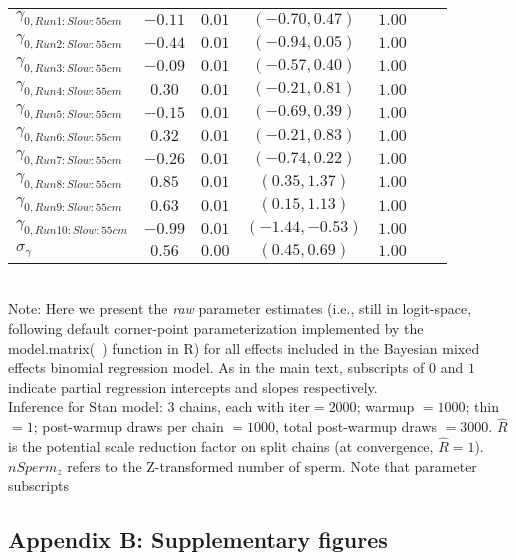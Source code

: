 \documentclass{article}
\begin{document}
\begin{table}[!ht]
\begin{tabular}{l c c c c c c}
$\gamma_{0,Run1:Slow:55cm}$   & $-0.11$ & $0.01$ & $(-0.70, 0.47)$ & $1.00$ \\
$\gamma_{0,Run2:Slow:55cm}$   & $-0.44$ & $0.01$ & $(-0.94, 0.05)$ & $1.00$ \\
$\gamma_{0,Run3:Slow:55cm}$   & $-0.09$ & $0.01$ & $(-0.57, 0.40)$ & $1.00$ \\
$\gamma_{0,Run4:Slow:55cm}$   & $ 0.30$ & $0.01$ & $(-0.21, 0.81)$ & $1.00$ \\
$\gamma_{0,Run5:Slow:55cm}$   & $-0.15$ & $0.01$ & $(-0.69, 0.39)$ & $1.00$ \\
$\gamma_{0,Run6:Slow:55cm}$   & $ 0.32$ & $0.01$ & $(-0.21, 0.83)$ & $1.00$ \\
$\gamma_{0,Run7:Slow:55cm}$   & $-0.26$ & $0.01$ & $(-0.74, 0.22)$ & $1.00$ \\
$\gamma_{0,Run8:Slow:55cm}$   & $ 0.85$ & $0.01$ & $( 0.35, 1.37)$ & $1.00$ \\
$\gamma_{0,Run9:Slow:55cm}$   & $ 0.63$ & $0.01$ & $( 0.15, 1.13)$ & $1.00$ \\
$\gamma_{0,Run10:Slow:55cm}$  & $-0.99$ & $0.01$ & $(-1.44,-0.53)$ & $1.00$ \\
$\sigma_{\gamma}$             & $ 0.56$ & $0.00$ & $( 0.45, 0.69)$ & $1.00$ \\
\hline
\end{tabular}
\smallskip{} \\
{\footnotesize Note: Here we present the \textit{raw} parameter estimates (i.e., still in logit-space, following default corner-point parameterization implemented by the model.matrix(~) function in R) for all effects included in the Bayesian mixed effects binomial regression model. As in the main text, subscripts of $0$ and $1$ indicate partial regression intercepts and slopes respectively.\\Inference for Stan model: $3$ chains, each with iter$=2000$; warmup $ = 1000$; thin $= 1$; post-warmup draws per chain $= 1000$, total post-warmup draws $= 3000$. $\hat{R}$ is the potential scale reduction factor on split chains (at convergence, $\hat{R} = 1$). $nSperm_z$ refers to the Z-transformed number of sperm. Note that parameter subscripts }
\end{table}
\bigskip








\newpage{}

\subsection*{Appendix B: Supplementary figures}
\renewcommand{\theequation}{S\arabic{equation}}
\setcounter{equation}{0}
\renewcommand{\thefigure}{S\arabic{figure}}
\setcounter{figure}{0}
\end{document}
